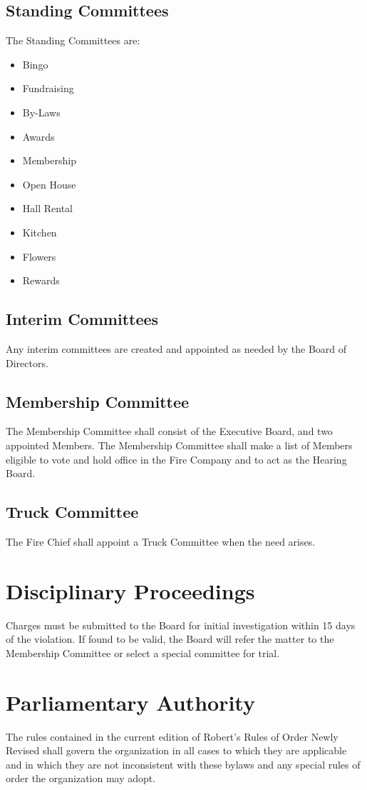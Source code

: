 ﻿\documentclass[12pt,letterpaper]{article}
\begin{document}
\subsection{Standing Committees}
The Standing Committees are: 
\begin{itemize}
\item Bingo 
\item Fundraising 
\item By-Laws 
\item Awards
\item Membership
\item Open House 
\item Hall Rental 
\item Kitchen 
\item Flowers
\item Rewards
\end{itemize}

\subsection{Interim Committees}
Any interim committees are created and appointed as needed by the Board of Directors.

\subsection{Membership Committee}
The Membership Committee shall consist of the Executive Board, and two appointed Members. The Membership Committee shall make a list of Members eligible to vote and hold office in the Fire Company and to act as the Hearing Board.

\subsection{Truck Committee}
The Fire Chief shall appoint a Truck Committee when the need arises.

\section{Disciplinary Proceedings}
Charges must be submitted to the Board for initial investigation within 15 days of the violation.  If found to be valid, the Board will refer the matter to the Membership Committee or select a special committee for trial.

\section{Parliamentary Authority}
The rules contained in the current edition of Robert's Rules of Order Newly Revised shall govern the organization in all cases to which they are applicable and in which they are not inconsistent with these bylaws and any special rules of order the organization may adopt.
\end{document}
